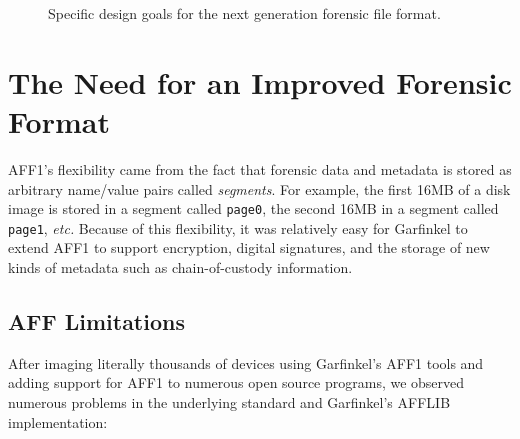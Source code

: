 \documentclass[10pt, conference]{IEEEtran}
\begin{document}
\begin{figure}
\caption{Specific design goals for the next generation forensic file
  format.}
\end{figure}
\section{The Need for an Improved Forensic Format}

AFF1's flexibility came from the fact that forensic data and metadata
is stored as arbitrary name/value pairs called \emph{segments}. For
example, the first 16MB of a disk image is stored in a segment called
\texttt{page0}, the second 16MB in a segment called \texttt{page1},
\emph{etc.} Because of this flexibility, it was relatively easy for
Garfinkel to extend AFF1 to support encryption, digital signatures, and
the storage of new kinds of metadata such as chain-of-custody
information\cite{garfinkel:affcrypto}. 

\subsection{AFF Limitations}
After imaging literally thousands of devices using Garfinkel's AFF1
tools and adding support for AFF1 to numerous open source programs, we
observed numerous problems in the underlying standard
and Garfinkel's AFFLIB implementation:
\end{document}

